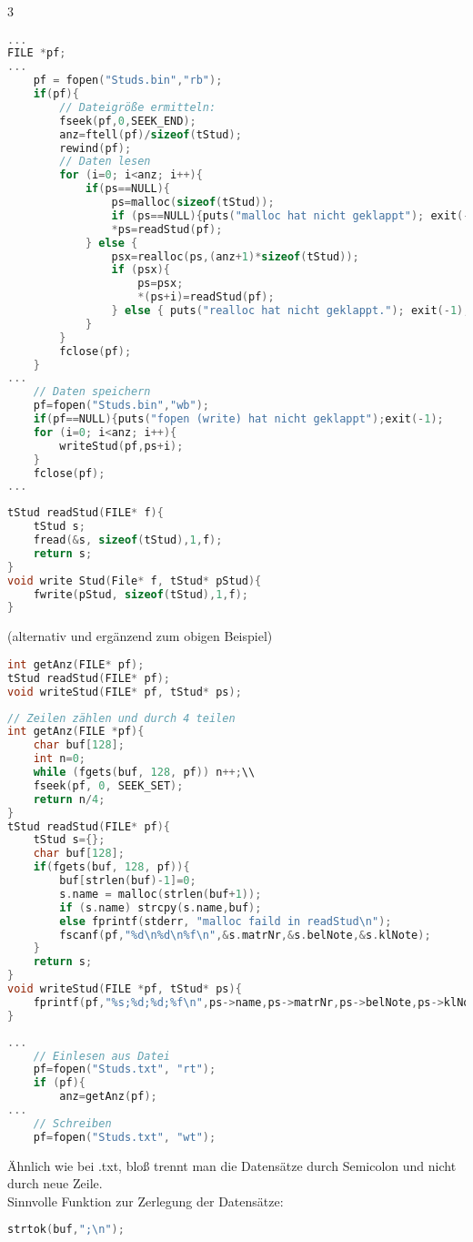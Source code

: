 \begin{multicols*}{3}
\begin{lstlisting}[language=C]
...
FILE *pf;
...
	pf = fopen("Studs.bin","rb");
	if(pf){
		// Dateigröße ermitteln:
		fseek(pf,0,SEEK_END);
		anz=ftell(pf)/sizeof(tStud);
		rewind(pf);		
		// Daten lesen
		for (i=0; i<anz; i++){
			if(ps==NULL){
				ps=malloc(sizeof(tStud));
				if (ps==NULL){puts("malloc hat nicht geklappt"); exit(-1);}
				*ps=readStud(pf);
			} else {	
				psx=realloc(ps,(anz+1)*sizeof(tStud));
				if (psx){
					ps=psx;
					*(ps+i)=readStud(pf);
				} else { puts("realloc hat nicht geklappt."); exit(-1);}
			}
		}
		fclose(pf);
	}
...
	// Daten speichern
	pf=fopen("Studs.bin","wb");
	if(pf==NULL){puts("fopen (write) hat nicht geklappt");exit(-1);
	for (i=0; i<anz; i++){
		writeStud(pf,ps+i);
	}
	fclose(pf);
...
\end{lstlisting}
\begin{lstlisting}[language=C]
tStud readStud(FILE* f){
	tStud s;
	fread(&s, sizeof(tStud),1,f);
	return s;
}
void write Stud(File* f, tStud* pStud){
	fwrite(pStud, sizeof(tStud),1,f);
}
\end{lstlisting}
 (alternativ und ergänzend zum obigen Beispiel)
\begin{lstlisting}[language=C]
int getAnz(FILE* pf);
tStud readStud(FILE* pf);
void writeStud(FILE* pf, tStud* ps);
\end{lstlisting}
\begin{lstlisting}[language=C]
// Zeilen zählen und durch 4 teilen
int getAnz(FILE *pf){
	char buf[128];
	int n=0;
	while (fgets(buf, 128, pf)) n++;\\
	fseek(pf, 0, SEEK_SET);
	return n/4;
}
tStud readStud(FILE* pf){
	tStud s={};
	char buf[128];
	if(fgets(buf, 128, pf)){
		buf[strlen(buf)-1]=0;
		s.name = malloc(strlen(buf+1));
		if (s.name) strcpy(s.name,buf);
		else fprintf(stderr, "malloc faild in readStud\n");
		fscanf(pf,"%d\n%d\n%f\n",&s.matrNr,&s.belNote,&s.klNote);
	}
	return s;
}
void writeStud(FILE *pf, tStud* ps){
	fprintf(pf,"%s;%d;%d;%f\n",ps->name,ps->matrNr,ps->belNote,ps->klNote);  
}
\end{lstlisting}
\begin{lstlisting}[language=C]
...
	// Einlesen aus Datei
	pf=fopen("Studs.txt", "rt");
	if (pf){
		anz=getAnz(pf);		
...
	// Schreiben
	pf=fopen("Studs.txt", "wt");
\end{lstlisting}

Ähnlich wie bei .txt, bloß trennt man die Datensätze durch Semicolon und nicht durch neue Zeile.\\
Sinnvolle Funktion zur Zerlegung der Datensätze: 
\begin{lstlisting}[language=C]
strtok(buf,";\n");
\end{lstlisting}


\end{multicols*}
